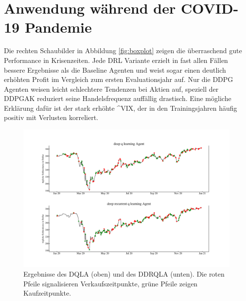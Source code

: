 \section{Anwendung während der COVID-19 Pandemie}
\label{sec:covid}

Die rechten Schaubilder in Abbildung \ref{fig:boxplot} zeigen die überraschend gute Performance in Krisenzeiten.
Jede \acs{DRL} Variante erzielt in fast allen Fällen bessere Ergebnisse als die Baseline Agenten und weist sogar einen deutlich erhöhten Profit im Vergleich zum ersten Evaluationsjahr auf.
Nur die \acs{DDPG} Agenten weisen leicht schlechtere Tendenzen bei Aktien auf, speziell der \acs{DDPGAK} reduziert seine Handelsfrequenz auffällig drastisch. Eine mögliche Erklärung dafür ist der stark erhöhte \acs{^VIX}, der in den Trainingsjahren häufig positiv mit Verlusten korreliert.

\begin{figure}[t!]
\center
\includegraphics[scale=0.95]{figures/plot2.pdf}
\vspace{0.1mm}
\caption[Handlungsentscheidungen zweier Agenten während der COVID-19 Krise]{Ergebnisse des \acs{DQLA} (oben) und des \acs{DDRQLA} (unten). Die roten Pfeile signalisieren Verkaufszeitpunkte, grüne Pfeile zeigen Kaufzeitpunkte.}
  \label{fig:agentenspectime}
\end{figure}

